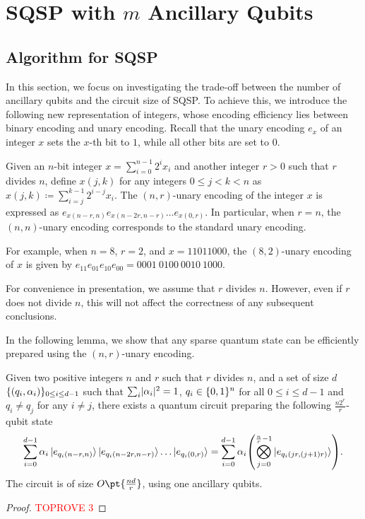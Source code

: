 \documentclass[a4paper,UKenglish,cleveref, autoref, thm-restate]{lipics-v2021}
\DeclarePairedDelimiter\rbra{\lparen}{\rparen}
\DeclarePairedDelimiter\cbra{\{}{\}}
\DeclarePairedDelimiter\abs{\lvert}{\rvert}
\newcommand{\bo}{O\pt}
\begin{document}
\section{\texorpdfstring{SQSP with $m$ Ancillary Qubits}{SQSP with m Ancillary Qubits}}\label{sec:with}

\subsection{Algorithm for SQSP}
In this section, we focus on investigating the trade-off between the number of ancillary qubits and the circuit size of SQSP. To achieve this, we introduce the following new representation of integers, whose encoding efficiency lies between binary encoding and unary encoding.
Recall that the unary encoding $e_x$ of an integer $x$ sets the $x$-th bit to $1$, while all other bits are set to $0$. 

\begin{definition}\label{def:nr}
Given an $n$-bit integer $x = \sum_{i=0}^{n-1}2^i x_i$ and another integer $r > 0$ such that $r$ divides $n$, define $x(j, k)$ for any integers $0 \leq j < k < n$ as $x(j, k) \coloneqq \sum_{i=j}^{k-1} 2^{i-j}x_i$. The $(n, r)$-unary encoding of the integer $x$ is expressed as $e_{x(n-r, n)} e_{x(n-2r, n-r)} \dots e_{x(0, r)}$. In particular, when $r = n$, the $(n, n)$-unary encoding corresponds to the standard unary encoding.
\end{definition}

For example, when $n = 8$, $r = 2$, and $x = 11011000$, the $(8, 2)$-unary encoding of $x$ is given by $e_{11}e_{01}e_{10}e_{00} = 0001\ 0100\ 0010\ 1000$.

\begin{remark}
    For convenience in presentation, we assume that $ r $ divides $ n $. However, even if $ r $ does not divide $ n $, this will not affect the correctness of any subsequent conclusions.
\end{remark}

In the following lemma, we show that any sparse quantum state can be efficiently prepared using the $(n, r)$-unary encoding.

\begin{lemma}
    Given two positive integers $n$ and $r$ such that $r$ divides $n$, and a set of size $d$ $\cbra{(q_i, \alpha_i)}_{0 \leq i \leq d-1}$ such that $\sum_i \abs{\alpha_i}^2 = 1$, $q_i \in \cbra{0, 1}^n$ for all $0 \leq i \leq d-1$ and $q_i \neq q_j$ for any $i \neq j$, there exists a quantum circuit preparing the following $\frac{n2^r}{r}$-qubit state
    \begin{align}
        \sum_{i=0}^{d-1} \alpha_i \ket{e_{q_i(n-r, n)}} \ket{e_{q_i(n-2r, n-r)}} \dots \ket{e_{q_i(0, r)}}
        = \sum_{i=0}^{d-1} \alpha_i \rbra*{\bigotimes_{j=0}^{\frac{n}{r}-1} \ket{e_{q_i(jr, (j+1)r)}}}.
    \end{align}
    The circuit is of size $\bo{\frac{nd}{r}}$, using one ancillary qubits.
\end{lemma}
\begin{proof}\textcolor{red}{TOPROVE 3}\end{proof}
\end{document}
